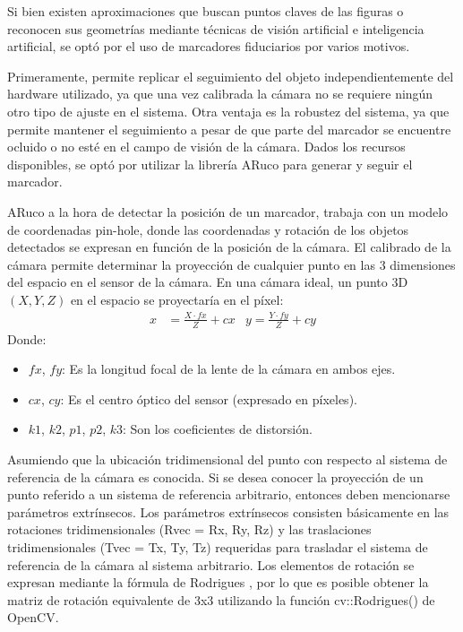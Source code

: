 Si bien existen aproximaciones que buscan puntos claves de las figuras o reconocen sus geometrías mediante técnicas de visión artificial e inteligencia artificial, se optó por el uso de  marcadores fiduciarios por varios motivos.

Primeramente, permite replicar el seguimiento del objeto independientemente del hardware utilizado, ya que una vez calibrada la cámara no se requiere ningún otro tipo de ajuste en el sistema. Otra ventaja es la robustez del sistema, ya que permite mantener el seguimiento a pesar de que parte del marcador se encuentre ocluido o no esté en el campo de visión de la cámara.
Dados los recursos disponibles, se optó por utilizar la librería ARuco para generar y seguir el marcador.

ARuco a la hora de detectar la posición de un marcador, trabaja con un modelo de coordenadas pin-hole, donde las coordenadas y rotación de los objetos detectados se expresan en función de la posición de la cámara.
El calibrado de la cámara permite determinar la proyección de cualquier punto en las 3 dimensiones del espacio en el sensor de la cámara. En una cámara ideal, un punto 3D $(X, Y, Z)$ en el espacio se proyectaría en el píxel:
\begin{align*}
x &= \frac{X \cdot fx}{Z} + cx & y = \frac{Y \cdot fy}{Z} + cy
\end{align*}
Donde:
\begin{itemize}
\item $fx$, $fy$: Es la longitud focal de la lente de la cámara en ambos ejes.
\item $cx$, $cy$: Es el centro óptico del sensor (expresado en píxeles).
\item $k1$, $k2$, $p1$, $p2$, $k3$: Son los coeficientes de distorsión.
\end{itemize}
Asumiendo que la ubicación tridimensional del punto con respecto al sistema de referencia de la cámara es conocida. Si se desea conocer la proyección de un punto referido a un sistema de referencia arbitrario, entonces deben mencionarse parámetros extrínsecos. Los parámetros extrínsecos consisten básicamente en las rotaciones tridimensionales (Rvec = {Rx, Ry, Rz}) y las traslaciones tridimensionales (Tvec = {Tx, Ty, Tz}) requeridas para trasladar el sistema de referencia de la cámara al sistema arbitrario. Los elementos de rotación se expresan mediante la fórmula de Rodrigues \cite{mebius2007derivation}, por lo que es posible obtener la matriz de rotación equivalente de 3x3 utilizando la función cv::Rodrigues() de OpenCV.

